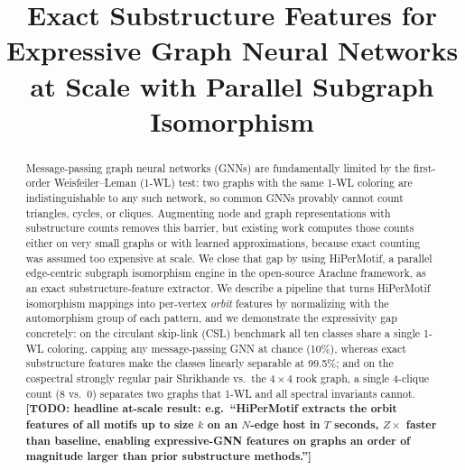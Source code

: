 \documentclass[conference]{IEEEtran}
\newcommand{\todo}[1]{{\color{red}\textbf{[TODO: #1]}}}
\begin{document}
\title{Exact Substructure Features for Expressive Graph Neural Networks at Scale
with Parallel Subgraph Isomorphism}

\author{
}

\maketitle

\begin{abstract}
Message-passing graph neural networks (GNNs) are fundamentally limited by the
first-order Weisfeiler--Leman (1-WL) test: two graphs with the same 1-WL coloring
are indistinguishable to any such network, so common GNNs provably cannot count
triangles, cycles, or cliques. Augmenting node and graph representations with
substructure counts removes this barrier, but existing work computes those counts
either on very small graphs or with learned approximations, because exact counting
was assumed too expensive at scale. We close that gap by using HiPerMotif, a
parallel edge-centric subgraph isomorphism engine in the open-source Arachne
framework, as an exact substructure-feature extractor. We describe a pipeline that
turns HiPerMotif isomorphism mappings into per-vertex \emph{orbit} features by
normalizing with the automorphism group of each pattern, and we demonstrate the
expressivity gap concretely: on the circulant skip-link (CSL) benchmark all ten
classes share a single 1-WL coloring, capping any message-passing GNN at chance
(10\%), whereas exact substructure features make the classes linearly separable at
99.5\%; and on the cospectral strongly regular pair Shrikhande vs.\ the $4\times4$
rook graph, a single 4-clique count (8 vs.\ 0) separates two graphs that 1-WL and
all spectral invariants cannot. \todo{headline at-scale result: e.g.\ ``HiPerMotif
extracts the orbit features of all motifs up to size $k$ on an $N$-edge host in
$T$ seconds, $Z\times$ faster than baseline, enabling expressive-GNN features on
graphs an order of magnitude larger than prior substructure methods.''}
\end{abstract}
\end{document}
